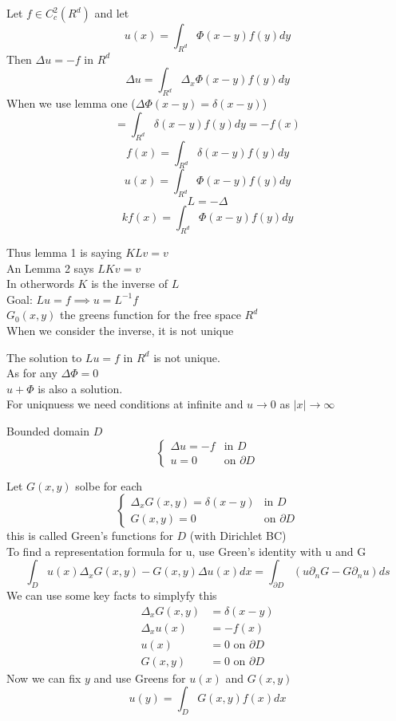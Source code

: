 \documentclass[answers,12pt,addpoints]{exam}
\begin{document}
\begin{lemma}
    Let $f \in C^2_c (R^d)$ and let 
    $$ u(x) = \int_{R^d} \Phi(x-y) f(y) dy$$
    Then $\Delta u = -f$ in $R^d$\\
    $$ \Delta u =\int_{R^d} \Delta_x \Phi(x-y) f(y) dy$$
    When we use lemma one ($\Delta \Phi(x-y) = \delta(x-y)$)\\
    $$ = \int_{R^d} \delta(x-y) f(y) dy = -f(x)$$
    $$f(x) = \int_{R^d} \delta(x-y) f(y) dy$$
    $$u(x) = \int_{R^d} \Phi(x-y) f(y) dy$$
    $$L = -\Delta$$
    $$k f(x) = \int_{R^d} \Phi(x-y) f(y) dy$$
\end{lemma}
Thus lemma 1 is saying $K L v = v$\\
An Lemma 2 says $L K v = v$\\
In otherwords $K$ is the inverse of $L$\\
Goal: $Lu = f \implies u = L^{-1}f$\\
$G_0 (x,y)$ the greens function for  the free space $R^d$\\
When we consider the inverse, it is not unique 
\begin{remark}
    The solution to $Lu = f$ in $R^d$ is not unique.\\
    As for any $\Delta \Phi = 0$\\
    $u + \Phi$ is also a solution.\\
    For uniqnuess we need conditions at infinite and $u \to 0$ as $|x| \to \infty$\\
\end{remark}
Bounded domain $D$\\
$$ \begin{cases}
    \Delta u = - f & \text{in } D\\
    u = 0 & \text{on } \partial D
\end{cases}$$
\begin{definition}
    Let $G(x,y)$ solbe for each 
    $$ \begin{cases}
        \Delta_x G(x,y) = \delta(x-y) & \text{in } D\\
        G(x,y) = 0 & \text{on } \partial D
    \end{cases}$$
    this is called Green's functions for $D$ (with Dirichlet BC)\\
    To find a representation formula for u, use Green's identity with u and G\\
    $$\int_D u(x) \Delta_x G(x,y) - G(x,y) \Delta u(x) dx = \int_{\partial D} (u \partial_n G - G \partial_n u) ds$$
    We can use some key facts to simplyfy this
    \begin{align*}
        \Delta_x G(x,y) &= \delta(x-y)\\
        \Delta_x u(x) &= -f(x)\\
        u(x) &= 0 \text{ on } \partial D\\
        G(x,y) &= 0 \text{ on } \partial D
    \end{align*} 
    Now we can fix $y$ and use Greens for $u(x)$ and $G(x,y)$
    $$ u(y) = \int_D G(x,y) f(x) dx$$
\end{definition}
\end{document}
